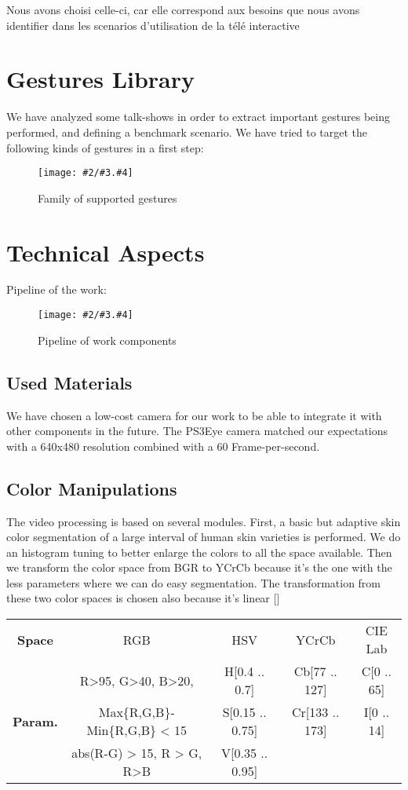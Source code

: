 \documentclass{llncs}
\newcommand\ignore[1]{}
\newcommand{\imagepathext}[5]{%
\begin{figure}[hbtp]
\hfil\texttt{[image: \#2/\#3.\#4]}\hfil
\caption{#5\label{#3}}
\end{figure}}
\newcommand{\png}[2]{\imagepathext{width=\columnwidth}{pics}{#1}{png}{#2}}
\begin{document}
Nous avons choisi celle-ci, car elle correspond aux besoins que nous avons identifier dans les scenarios d'utilisation de la télé interactive

\section{Gestures Library}
We have analyzed some talk-shows in order to extract important gestures being performed, and defining a benchmark scenario. 
We have tried to target the following kinds of gestures in a first step:

\ignore{
(Get the Study from the report + pics + refs)
}

\png{handg}{Family of supported gestures}
\ignore{
Explanation of the figures

Steps for skin-color based gesture detection
}
\section{Technical Aspects}
Pipeline of the work:
\png{pipeline}{Pipeline of work components}

\subsection{Used Materials}
We have chosen a low-cost camera for our work to be able to integrate it with other components in the future.
The PS3Eye camera matched our expectations with a 640x480 resolution combined with a 60 Frame-per-second.

\ignore{
} 

\subsection{Color Manipulations}
The video processing is based on several modules. First, a basic but adaptive skin color segmentation of a large interval of human skin varieties is performed. 
We do an histogram tuning to better enlarge the colors to all the space available.
Then we transform the color space from BGR to YCrCb because it’s the one with the less parameters where we can do easy segmentation. The transformation from these two color spaces is chosen also because it’s linear []

\begin{center}
\begin{tabular}{c|c|c|c|c}
\textbf{Space} & RGB & HSV & YCrCb & CIE Lab\\
  & R>95, G>40, B>20, & H[0.4 .. 0.7] & Cb[77 .. 127] & C[0 .. 65] \\
\textbf{Param.} & Max\{R,G,B\}-Min\{R,G,B\} < 15 & S[0.15 .. 0.75] & Cr[133 .. 173] & I[0 .. 14] \\
  & abs(R-G) > 15, R > G, R>B & V[0.35 .. 0.95] & &
\end{tabular}
\end{center}
\end{document}
